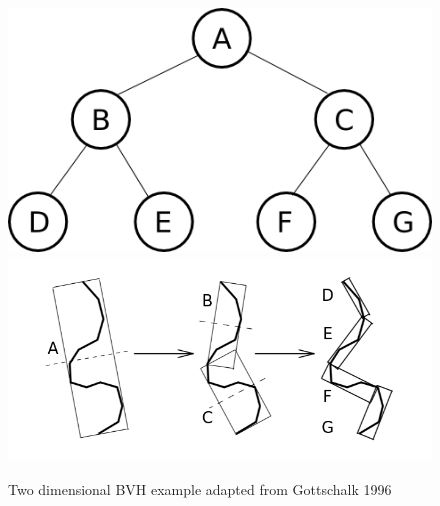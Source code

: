 \documentclass[12pt, a4paper]{article}
\begin{document}
\begin{figure}[H]
  \caption{Two dimensional BVH example adapted from Gottschalk 1996 \cite{gottschalk1996obbtree}}
  \label{2dbvh}
  \centering
  \includegraphics[scale=0.3]{binary_graph.png}
  \includegraphics[scale=0.3, trim = 0 50 0 0 ]{bvh_2d_ex.png}
\end{figure}

\end{document}
